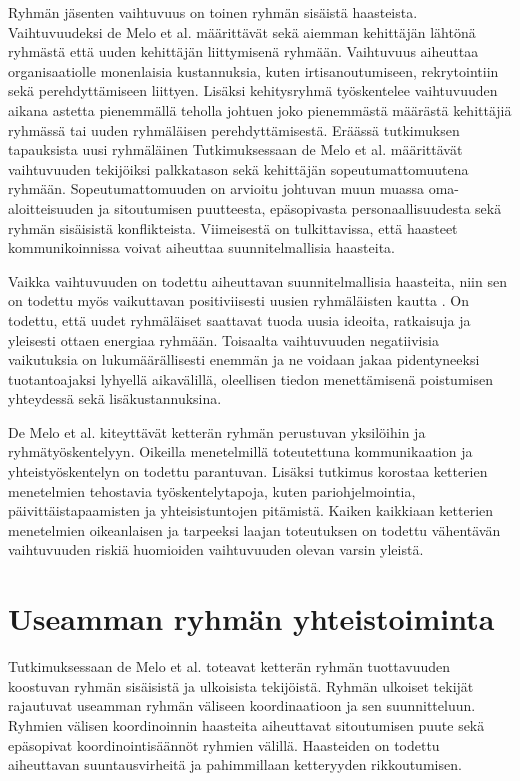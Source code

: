 Ryhmän jäsenten vaihtuvuus on toinen ryhmän sisäistä haasteista. Vaihtuvuudeksi de Melo et al. \cite{DEOMELO2013412} määrittävät sekä aiemman kehittäjän lähtönä ryhmästä että uuden kehittäjän liittymisenä ryhmään. Vaihtuvuus aiheuttaa organisaatiolle monenlaisia kustannuksia, kuten irtisanoutumiseen, rekrytointiin sekä perehdyttämiseen liittyen. Lisäksi kehitysryhmä työskentelee vaihtuvuuden aikana astetta pienemmällä teholla johtuen joko pienemmästä määrästä kehittäjiä ryhmässä tai uuden ryhmäläisen perehdyttämisestä. Eräässä tutkimuksen tapauksista uusi ryhmäläinen  Tutkimuksessaan de Melo et al. määrittävät vaihtuvuuden tekijöiksi palkkatason sekä kehittäjän sopeutumattomuutena ryhmään. Sopeutumattomuuden on arvioitu johtuvan muun muassa oma-aloitteisuuden ja sitoutumisen puutteesta, epäsopivasta personaallisuudesta sekä ryhmän sisäisistä konflikteista. Viimeisestä on tulkittavissa, että haasteet kommunikoinnissa voivat aiheuttaa suunnitelmallisia haasteita. 

Vaikka vaihtuvuuden on todettu aiheuttavan suunnitelmallisia haasteita, niin sen on todettu myös vaikuttavan positiviisesti uusien ryhmäläisten kautta \cite{DEOMELO2013412}. On todettu, että uudet ryhmäläiset saattavat tuoda uusia ideoita, ratkaisuja ja yleisesti ottaen energiaa ryhmään. Toisaalta vaihtuvuuden negatiivisia vaikutuksia on lukumäärällisesti enemmän ja ne voidaan jakaa pidentyneeksi tuotantoajaksi lyhyellä aikavälillä, oleellisen tiedon menettämisenä poistumisen yhteydessä sekä lisäkustannuksina. 

De Melo et al. \cite{DEOMELO2013412} kiteyttävät ketterän ryhmän perustuvan yksilöihin ja ryhmätyöskentelyyn. Oikeilla menetelmillä toteutettuna kommunikaation ja yhteistyöskentelyn on todettu parantuvan. Lisäksi tutkimus korostaa ketterien menetelmien tehostavia työskentelytapoja, kuten pariohjelmointia, päivittäistapaamisten ja yhteisistuntojen pitämistä. Kaiken kaikkiaan ketterien menetelmien oikeanlaisen ja tarpeeksi laajan toteutuksen on todettu vähentävän vaihtuvuuden riskiä huomioiden vaihtuvuuden olevan varsin yleistä.

\section{Useamman ryhmän yhteistoiminta}

Tutkimuksessaan de Melo et al. \cite{DEOMELO2013412} toteavat ketterän ryhmän tuottavuuden koostuvan ryhmän sisäisistä ja ulkoisista tekijöistä. Ryhmän ulkoiset tekijät rajautuvat useamman ryhmän väliseen koordinaatioon ja sen suunnitteluun. Ryhmien välisen koordinoinnin haasteita aiheuttavat sitoutumisen puute sekä epäsopivat koordinointisäännöt ryhmien välillä. Haasteiden on todettu aiheuttavan suuntausvirheitä ja pahimmillaan ketteryyden rikkoutumisen. 